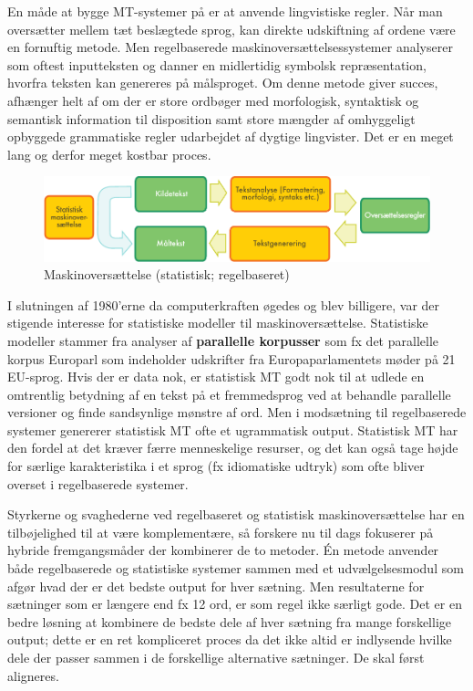 \begin{multicols}{2}
En m\aa de at bygge MT-systemer \mbox{p\aa} er at anvende lingvistiske regler. N\aa r man overs\ae tter mellem t\ae t besl\ae gtede sprog, kan direkte udskiftning af ordene v\ae re en fornuftig metode. Men regelbaserede maskinovers\ae ttelsessystemer analyserer som oftest inputteksten og danner en midlertidig symbolsk repr\ae sentation, hvorfra teksten kan genereres \mbox{p\aa} m\aa lsproget. Om denne metode giver succes, afh\ae nger helt af om der er store ordb\o ger med morfologisk, syntaktisk og semantisk information til disposition samt store m\ae ngder af omhyggeligt opbyggede grammatiske regler udarbejdet af dygtige lingvister. Det er en meget lang og derfor meget kostbar proces.

\begin{figure}[htb]
  \center
  \includegraphics[width=\textwidth]{../_media/danish/machine_translation}
  \caption{Maskinovers\ae ttelse (statistisk; regelbaseret)}
  \label{fig:mtarch_de}
\end{figure}

I slutningen af 1980'erne da computerkraften \o gedes og blev billigere, var der stigende interesse for statistiske modeller til maskinovers\ae ttelse. Statistiske modeller stammer fra analyser af {\bf parallelle korpusser} som fx det parallelle korpus Europarl som indeholder udskrifter fra Europaparlamentets m\o der \mbox{p\aa} 21 EU-sprog. Hvis der er data nok, er statistisk MT godt nok til at udlede en omtrentlig betydning af en tekst \mbox{p\aa} et fremmedsprog ved at behandle parallelle versioner og finde sandsynlige m\o nstre af ord. Men i mods\ae tning til regelbaserede systemer genererer statistisk MT ofte et ugrammatisk output. Statistisk MT har den fordel at det kr\ae ver f\ae rre menneskelige resurser, og det kan \mbox{ogs\aa} tage h\o jde for s\ae rlige karakteristika i et sprog (fx idiomatiske udtryk) som ofte bliver overset i regelbaserede systemer. 

Styrkerne og svaghederne ved regelbaseret og statistisk maskinovers\ae ttelse har en tilb\o jelighed til at v\ae re komplement\ae re, \mbox{s\aa} forskere nu til dags fokuserer \mbox{p\aa} hybride fremgangsm\aa der der kombinerer de to metoder. \'{E}n metode anvender b\aa de regelbaserede og statistiske systemer sammen med et udv\ae lgelsesmodul som afg\o r hvad der er det bedste output for hver s\ae tning. Men resultaterne for s\ae tninger som er l\ae ngere end fx 12 ord, er som regel ikke s\ae rligt gode. Det er en bedre l\o sning at kombinere de bedste dele af hver s\ae tning fra mange forskellige output; dette er en ret kompliceret proces da det ikke altid er indlysende hvilke dele der passer sammen i de forskellige alternative s\ae tninger. De skal f\o rst aligneres.


\end{multicols}
